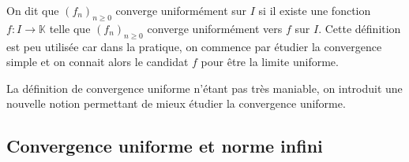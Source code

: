 \documentclass[a4paper,10pt]{report}
\begin{document}
\newpage

$\phantom{test}$

\vspace{3cm}

\begin{Remarque}{} On dit que $(f_n)_{n \geq 0}$ converge uniformément sur $I$ si il existe une fonction $f : I \rightarrow \mathbb{K}$ telle que $(f_n)_{n \geq 0}$ converge uniformément vers $f$ sur $I$. Cette définition est peu utilisée car dans la pratique, on commence par étudier la convergence simple et on connait alors le candidat $f$ pour être la limite uniforme.
\end{Remarque}

\medskip

La définition de convergence uniforme n'étant pas très maniable, on introduit une nouvelle notion permettant de mieux étudier la convergence uniforme.

\subsection{Convergence uniforme et norme infini}
%
%
%
\end{document}
